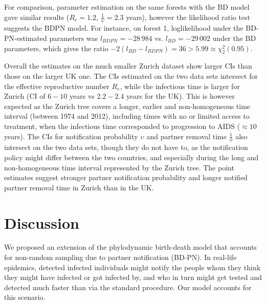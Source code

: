 \documentclass[10pt,letterpaper]{article}
\begin{document}
For comparison, parameter estimation on the same forests with the BD model gave similar results ($R_e = 1.2$, $\frac{1}{\psi} = 2.3$ years), however the likelihood ratio test suggests the BDPN model. For instance, on forest 1, loglikelihood under the BD-PN-estimated parameters was $l_{BDPN} = -28\,984$ vs. $l_{BD}=-29\,002$ under the BD parameters, which gives the ratio $-2 (l_{BD} - l_{BDPN}) =	36 > 5.99 \approx \chi^2_2(0.95)$. %

\bigskip

Overall the estimates on the much smaller Zurich dataset show larger CIs than those on the larger UK one. The CIs estimated on the two data sets intersect for the effective reproductive number $R_e$, while the infectious time is larger for Zurich (CI of $6-10$ years vs $2.2-2.4$ years for the UK). This is however expected as the Zurich tree covers a longer, earlier and non-homogeneous time interval (between 1974 and 2012), including times with no or limited access to treatment, when the infectious time corresponded to progression to AIDS ($\approx 10$ years). The CIs for notification probability $\upsilon$ and partner removal time $\frac{1}{\phi}$ also intersect on the two data sets, though they do not have to, as the notification policy might differ between the two countries, and especially during the long and non-homogeneous time interval represented by the Zurich tree. The point estimates suggest stronger partner notification probability and longer notified partner removal time in Zurich than in the UK.




\section*{Discussion}
We proposed an extension of the phylodynamic birth-death model that accounts for non-random sampling due to partner notification (BD-PN). In real-life epidemics, detected infected individuals might notify the people whom they think they might have infected or got infected by, and who in turn might get tested and detected much faster than via the standard procedure. Our model accounts for this scenario.
\end{document}
